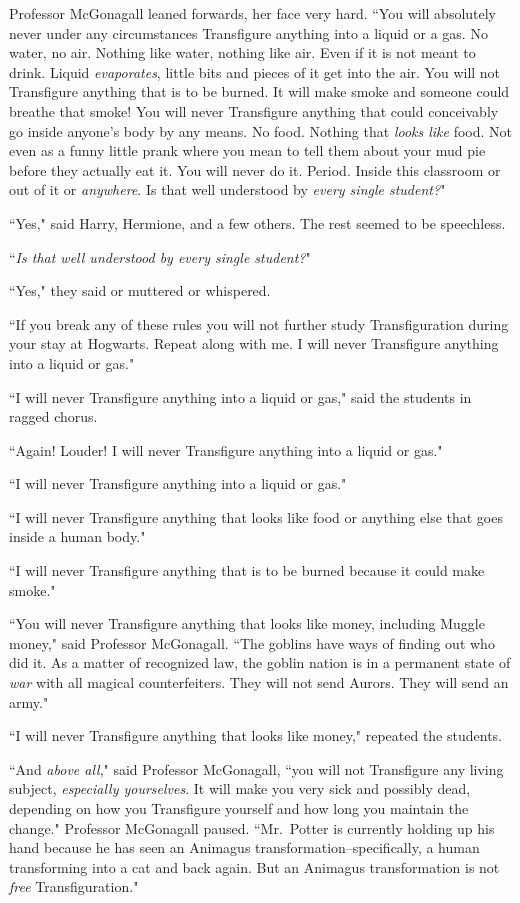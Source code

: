 Professor McGonagall leaned forwards, her face very hard. ``You will absolutely never under any circumstances Transfigure anything into a liquid or a gas. No water, no air. Nothing like water, nothing like air. Even if it is not meant to drink. Liquid \emph{evaporates}, little bits and pieces of it get into the air. You will not Transfigure anything that is to be burned. It will make smoke and someone could breathe that smoke! You will never Transfigure anything that could conceivably go inside anyone's body by any means. No food. Nothing that \emph{looks like} food. Not even as a funny little prank where you mean to tell them about your mud pie before they actually eat it. You will never do it. Period. Inside this classroom or out of it or \emph{anywhere}. Is that well understood by \emph{every single student?}"

``Yes," said Harry, Hermione, and a few others. The rest seemed to be speechless.

``\emph{Is that well understood by every single student?}"

``Yes," they said or muttered or whispered.

``If you break any of these rules you will not further study Transfiguration during your stay at Hogwarts. Repeat along with me. I will never Transfigure anything into a liquid or gas."

``I will never Transfigure anything into a liquid or gas," said the students in ragged chorus.

``Again! Louder! I will never Transfigure anything into a liquid or gas."

``I will never Transfigure anything into a liquid or gas."

``I will never Transfigure anything that looks like food or anything else that goes inside a human body."

``I will never Transfigure anything that is to be burned because it could make smoke."

``You will never Transfigure anything that looks like money, including Muggle money," said Professor McGonagall. ``The goblins have ways of finding out who did it. As a matter of recognized law, the goblin nation is in a permanent state of \emph{war} with all magical counterfeiters. They will not send Aurors. They will send an army."

``I will never Transfigure anything that looks like money," repeated the students.

``And \emph{above all}," said Professor McGonagall, ``you will not Transfigure any living subject, \emph{especially yourselves}. It will make you very sick and possibly dead, depending on how you Transfigure yourself and how long you maintain the change." Professor McGonagall paused. ``Mr.~Potter is currently holding up his hand because he has seen an Animagus transformation\---specifically, a human transforming into a cat and back again. But an Animagus transformation is not \emph{free} Transfiguration."

